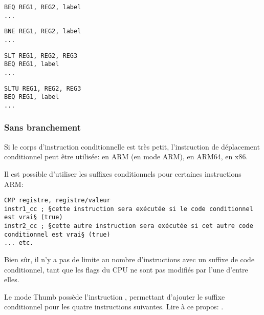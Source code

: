 \begin{lstlisting}[caption=Check si les valeurs sont égales (Branch if EQual),style=customasmMIPS]
BEQ REG1, REG2, label
...
\end{lstlisting}

\begin{lstlisting}[caption=Check si les valeurs ne sont pas égales (Branch if Not Equal),style=customasmMIPS]
BNE REG1, REG2, label
...
\end{lstlisting}

\begin{lstlisting}[caption=Check REG2 plus petit que REG3 (signé),style=customasmMIPS]
SLT REG1, REG2, REG3
BEQ REG1, label
...
\end{lstlisting}

\begin{lstlisting}[caption=Check REG2 plus petit que REG3 (non signé),style=customasmMIPS]
SLTU REG1, REG2, REG3
BEQ REG1, label
...
\end{lstlisting}

\subsubsection{Sans branchement}

Si le corps d'instruction conditionnelle est très petit, l'instruction de déplacement
conditionnel peut être utilisée:
 en ARM (en mode ARM),  en ARM64,  en x86.


Il est possible d'utiliser les suffixes conditionnels pour certaines instructions
ARM:

\begin{lstlisting}[caption=ARM (\ARMMode),style=customasmARM]
CMP registre, registre/valeur
instr1_cc ; §cette instruction sera exécutée si le code conditionnel est vrai§ (true)
instr2_cc ; §cette autre instruction sera exécutée si cet autre code conditionnel est vrai§ (true)
... etc.
\end{lstlisting}

Bien sûr, il n'y a pas de limite au nombre d'instructions avec un suffixe de code
conditionnel, tant que les flags du CPU ne sont pas modifiés par l'une d'entre elles.


Le mode Thumb possède l'instruction , permettant d'ajouter le suffixe conditionnel
pour les quatre instructions suivantes.
Lire à ce propos: .

